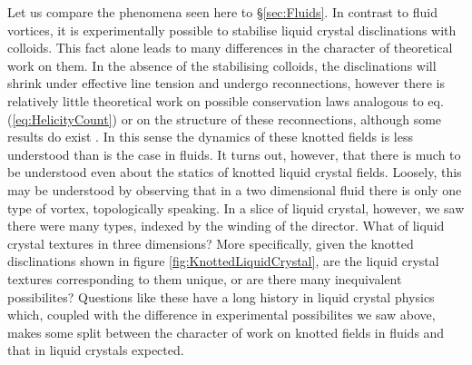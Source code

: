 Let us compare the phenomena seen here to \S\ref{sec:Fluids}. In contrast to fluid vortices, it is experimentally possible to stabilise liquid crystal disclinations with colloids. This fact alone leads to many differences in the character of theoretical work on them. In the absence of the stabilising colloids, the disclinations will shrink under effective line tension and undergo reconnections, however there is relatively little theoretical work on possible conservation laws analogous to eq. (\ref{eq:HelicityCount}) or on the structure of these reconnections, although some results do exist \cite{Machon}. In this sense the dynamics of these knotted fields is less understood than is the case in fluids.  It turns out, however, that there is much to be understood even about the statics of knotted liquid crystal fields. Loosely, this may be understood by observing that in a two dimensional fluid there is only one type of vortex, topologically speaking. In a slice of liquid crystal, however, we saw there were many types, indexed by the winding of the director. What of liquid crystal textures in three dimensions? More specifically, given the knotted disclinations shown in figure \ref{fig:KnottedLiquidCrystal}, are the liquid crystal textures corresponding to them unique, or are there many inequivalent possibilites? Questions like these have a long history in liquid crystal physics which, coupled with the difference in experimental possibilites we saw above, makes some split between the character of work on knotted fields in fluids and that in liquid crystals expected.

